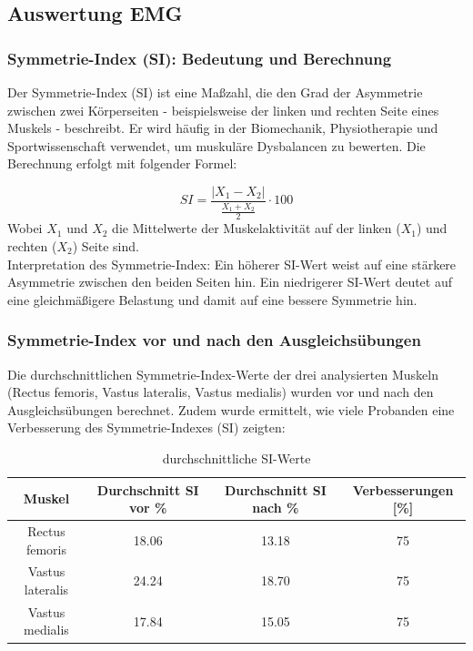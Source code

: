 \subsection{Auswertung EMG}
\subsubsection{Symmetrie-Index (SI): Bedeutung und Berechnung}

Der Symmetrie-Index (SI) ist eine Maßzahl, die den Grad der Asymmetrie zwischen zwei Körperseiten - beispielsweise der linken und rechten Seite eines Muskels - beschreibt.
Er wird häufig in der Biomechanik, Physiotherapie und Sportwissenschaft verwendet, um muskuläre Dysbalancen zu bewerten.
Die Berechnung erfolgt mit folgender Formel: \cite{bmcsportsscimedrehabil}

\begin{equation}
    SI = \frac{|X_1 - X_2|}{\frac{X_1 + X_2}{2}} \cdot 100
\end{equation}
Wobei $X_1$ und $X_2$ die Mittelwerte der Muskelaktivität auf der linken ($X_1$) und rechten ($X_2$) Seite sind.
\\
Interpretation des Symmetrie-Index:
Ein höherer SI-Wert weist auf eine stärkere Asymmetrie zwischen den beiden Seiten hin.
Ein niedrigerer SI-Wert deutet auf eine gleichmäßigere Belastung und damit auf eine bessere Symmetrie hin.

\subsubsection{Symmetrie-Index vor und nach den Ausgleichsübungen}

Die durchschnittlichen Symmetrie-Index-Werte der drei analysierten Muskeln (Rectus femoris, Vastus lateralis, Vastus medialis) wurden vor und nach den Ausgleichsübungen berechnet. Zudem wurde ermittelt, wie viele Probanden eine Verbesserung des Symmetrie-Indexes (SI) zeigten:

\begin{table}[htbp]
  \centering
    \begin{tabular}{|c|c|c|c|}
    \hline
    \textbf{Muskel} & \textbf{Durchschnitt SI vor \%} & \textbf{Durchschnitt SI nach \%} & {\textbf{Verbesserungen [\%]}} \\
    \hline
    Rectus femoris & \multicolumn{1}{c|}{18.06} & 13.18 & 75 \\
    \hline
    Vastus lateralis & 24.24 & 18.70 & 75 \\
    \hline
    Vastus medialis & 17.84 & 15.05 & 75 \\
    \hline
    \end{tabular}%
    \caption{durchschnittliche SI-Werte}
  \label{tab:durchschnittliche-SI-Werte}%
\end{table}%

